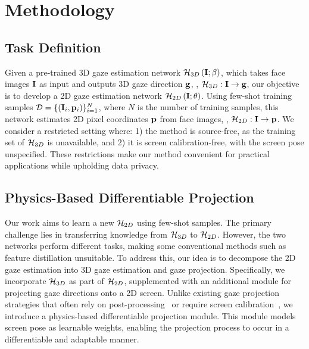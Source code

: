 
\section{Methodology}



\subsection{Task Definition}
Given a pre-trained 3D gaze estimation network $\mathcal{H}_{3D}\left(\mathbf{I};  \beta\right)$, which takes face images $\mathbf{I}$ as input and outputs 3D gaze direction $\mathbf{g}$, \ie, $\mathcal{H}_{3D}:\mathbf{I}\rightarrow\mathbf{g}$,
our objective is to develop a  2D gaze estimation network $\mathcal{H}_{2D}\left(\mathbf{I};  \theta\right)$. Using few-shot training samples $\mathcal{D} = \{(\mathbf{I}_i, \mathbf{p}_i)\}_{i=1}^N$, where $N$ is the number of training samples, this network estimates 2D pixel coordinates $\mathbf{p}$ from face images, \ie, $\mathcal{H}_{2D}:\mathbf{I} \rightarrow\mathbf{p}$. We consider a restricted setting where: 1) the method is source-free, as the training set of $\mathcal{H}_{3D}$ is unavailable, and 2) it is screen calibration-free, with the screen pose unspecified. These restrictions make our method convenient for practical applications while upholding data privacy. 


\subsection{Physics-Based Differentiable Projection}

Our work aims to learn a new $\mathcal{H}_{2D}$ using few-shot samples.
The primary challenge lies in transferring knowledge from $\mathcal{H}_{3D}$ to $\mathcal{H}_{2D}$. However, the two networks perform different tasks, making some conventional methods such as feature distillation unsuitable.
To address this, our idea is to decompose the 2D gaze estimation into 3D gaze estimation and gaze projection. Specifically, we incorporate $\mathcal{H}_{3D}$ as part of $\mathcal{H}_{2D}$, supplemented with an additional module for projecting gaze directions onto a 2D screen.
Unlike existing gaze projection strategies that often rely on post-processing~\cite{Cheng_2024_pami} or require screen calibration~\cite{Balim_2023_CVPR}, we introduce a physics-based differentiable projection module. This module models screen pose as learnable weights, enabling the projection process to occur in a differentiable and adaptable manner.


